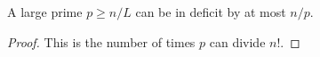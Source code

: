 \begin{sublemma}
\label{initial-factorization-large-prime-ge}
\leanok
A large prime $p \geq n/L$ can be in deficit by at most $n/p$.
\end{sublemma}
\begin{proof}
\leanok
This is the number of times $p$ can divide $n!$.
\end{proof}
